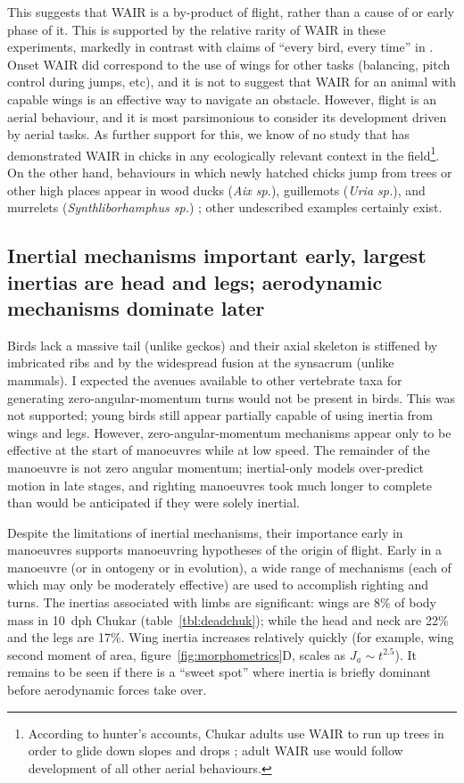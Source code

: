 \documentclass[10pt]{article}
\begin{document}
This suggests that WAIR is a by-product of flight, rather than a cause of or early phase of it. This is supported by the relative rarity of WAIR in these experiments, markedly in contrast with claims of ``every bird, every time'' in \citep{Dial:2003}. Onset WAIR did correspond to the use of wings for other tasks (balancing, pitch control during jumps, etc), and it is not to suggest that WAIR for an animal with capable wings is an effective way to navigate an obstacle.  However, flight is an aerial behaviour, and it is most parsimonious to consider its development driven by aerial tasks. As further support for this, we know of no study that has demonstrated WAIR in chicks in any ecologically relevant context in the field\footnote{According to hunter's accounts, Chukar adults use WAIR to run up trees in order to glide down slopes and drops \citep{Otoole:2003}; adult WAIR use would follow development of all other aerial behaviours.}.  On the other hand, behaviours in which newly hatched chicks jump from trees or other high places appear in wood ducks (\emph{Aix sp.}), guillemots (\emph{Uria sp.}), and murrelets (\emph{Synthliborhamphus sp.}) \citep{Attenborough:1998}; other undescribed examples certainly exist.  


\subsection{Inertial mechanisms important early, largest inertias are head and legs; aerodynamic mechanisms dominate later}
Birds lack a massive tail (unlike geckos) and their axial skeleton is stiffened by imbricated ribs and by the widespread fusion at the synsacrum (unlike mammals).  I expected the avenues available to other vertebrate taxa for generating zero-angular-momentum turns would not be present in birds.  This was not supported; young birds still appear partially capable of using inertia from wings and legs.  However, zero-angular-momentum mechanisms appear only to be effective at the start of manoeuvres while at low speed.  The remainder of the manoeuvre is not zero angular momentum; inertial-only models over-predict motion in late stages, and righting manoeuvres took much longer to complete than would be anticipated if they were solely inertial.  

Despite the limitations of inertial mechanisms, their importance early in manoeuvres supports manoeuvring hypotheses of the origin of flight.  Early in a manoeuvre (or in ontogeny or in evolution), a wide range of mechanisms (each of which may only be moderately effective) are used to accomplish righting and turns. The inertias associated with limbs are significant: wings are 8\% of body mass in \SI{10}{dph} Chukar (table~\ref{tbl:deadchuk}); while the head and neck are 22\% and the legs are 17\%.  Wing inertia increases relatively quickly (for example, wing second moment of area, figure~\ref{fig:morphometrics}D, scales as $J_a \sim t^{2.5}$). It remains to be seen if there is a ``sweet spot'' where inertia is briefly dominant before aerodynamic forces take over. 
\end{document}
